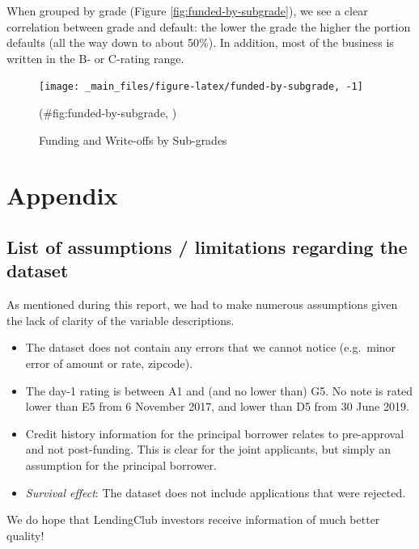 \documentclass[11pt,]{report}
\begin{document}
When grouped by grade (Figure \ref{fig:funded-by-subgrade}), we see a clear correlation between grade and default: the lower the grade the higher the portion defaults (all the way down to about 50\%). In addition, most of the business is written in the B- or C-rating range.

\begin{figure}

{\centering \texttt{[image: \_main\_files/figure-latex/funded-by-subgrade, -1]} 

}

\caption{Funding and Write-offs by Sub-grades}(\#fig:funded-by-subgrade, )
\end{figure}

\hypertarget{appendix}{%
\chapter*{Appendix}\label{appendix}}

\hypertarget{list-of-assumptions-limitations-regarding-the-dataset}{%
\section{List of assumptions / limitations regarding the dataset}\label{list-of-assumptions-limitations-regarding-the-dataset}}

As mentioned during this report, we had to make numerous assumptions given the lack of clarity of the variable descriptions.

\begin{itemize}
\item
  The dataset does not contain any errors that we cannot notice (e.g.~minor error of amount or rate, zipcode).
\item
  The day-1 rating is between A1 and (and no lower than) G5. No note is rated lower than E5 from 6 November 2017, and lower than D5 from 30 June 2019.
\item
  Credit history information for the principal borrower relates to pre-approval and not post-funding. This is clear for the joint applicants, but simply an assumption for the principal borrower.
\item
  \emph{Survival effect}: The dataset does not include applications that were rejected.
\end{itemize}

We do hope that LendingClub investors receive information of much better quality!
\end{document}

